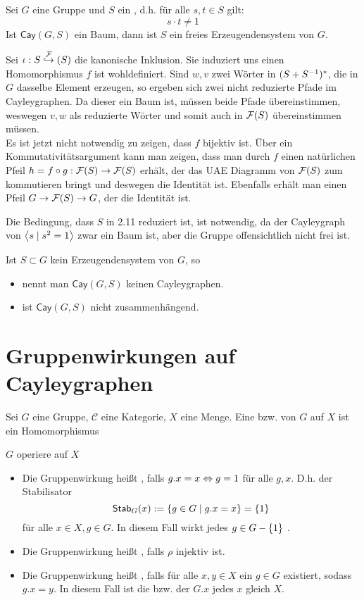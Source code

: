 \documentclass{article}
\newcommand{\tm}{\subset}
\newcommand{\Stab}[2]{\textsf{Stab}_{#1}(#2)}
\newcommand{\Cay}[2]{\textsf{Cay}(#1,#2)}
\renewcommand{\C}{\mathcal{C}}
\begin{document}
Sei $G$ eine Gruppe und $S$ ein , d.h. für alle $s,t \in S$ gilt:
\[ s\cdot t \neq 1 \]
Ist $\Cay{G}{S}$ ein Baum, dann ist $S$ ein freies Erzeugendensystem von $G$.

\begin{Beweis}{}
Sei $\iota : S \overset{\mathcal{F}}{\hookrightarrow}(S)$ die kanonische Inklusion. Sie induziert uns einen Homomorphismus
$f$ ist wohldefiniert. Sind $w, v$ zwei Wörter in $(S + S^{-1})^*$, die in $G$ dasselbe Element erzeugen, so ergeben sich zwei nicht reduzierte Pfade im Cayleygraphen. Da dieser ein Baum ist, müssen beide Pfade übereinstimmen, weswegen $v,w$ als reduzierte Wörter und somit auch in $\mathcal{F}(S)$ übereinstimmen müssen.\\
Es ist jetzt nicht notwendig zu zeigen, dass $f$ bijektiv ist. Über ein Kommutativitätsargument kann man zeigen, dass man durch $f$ einen natürlichen Pfeil $h = f \circ g : \mathcal{F}(S) \rightarrow \mathcal{F}(S)$ erhält, der das UAE Diagramm von $\mathcal{F}(S)$ zum kommutieren bringt und deswegen die Identität ist. Ebenfalls erhält man einen Pfeil $G \overset{}{\rightarrow} \mathcal{F}(S) \overset{}{\rightarrow} G$, der die Identität ist.
\end{Beweis}

Die Bedingung, dass $S$ in 2.11 reduziert ist, ist notwendig, da der Cayleygraph von
$\grp{s}{s^2 = 1}$
zwar ein Baum ist, aber die Gruppe offensichtlich nicht frei ist.

\Bem{}
Ist $S \tm G$ kein Erzeugendensystem von $G$, so
\begin{itemize}
\item nennt man $\Cay{G}{S}$ keinen Cayleygraphen.
\item ist $\Cay{G}{S}$ nicht zusammenhängend.
\end{itemize}

\newpage
\section{Gruppenwirkungen auf Cayleygraphen}
\Def{}
Sei $G$ eine Gruppe, $\C$ eine Kategorie, $X$ eine Menge. Eine  bzw.  von $G$ auf $X$ ist ein Homomorphismus


\Def{}
$G$ operiere auf $X$
\begin{itemize}
\item Die Gruppenwirkung heißt , falls $g.x = x \overset{}{\Leftrightarrow} g = 1$ für alle $g,x$. D.h. der Stabilisator
\[\Stab{G}{x} := \set{g \in G}{g.x = x}= \set{1}{}\]
für alle $x\in X, g \in G$. In diesem Fall wirkt jedes $g \in G- \set{1}{}$ .
\item Die Gruppenwirkung heißt , falls $\rho$ injektiv ist.
\item Die Gruppenwirkung heißt , falls für alle $x,y\in X$ ein $g\in G$ existiert, sodass $g.x = y$. In diesem Fall ist die  bzw. der  $G.x$ jedes $x$ gleich $X$.
\end{itemize}
\end{document}
